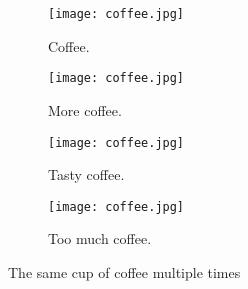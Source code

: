 \documentclass{article}
\begin{document}
	\begin{figure}[h!]
		\centering
		\begin{subfigure}[b]{0.2\linewidth}
		
			\texttt{[image: coffee.jpg]}
			\caption{Coffee.}
		\end{subfigure}
		\begin{subfigure}[b]{0.2\linewidth}
			
			\texttt{[image: coffee.jpg]}
			\caption{More coffee.}
		\end{subfigure}
		\begin{subfigure}[b]{0.2\linewidth}
	
			\texttt{[image: coffee.jpg]}
			\caption{Tasty coffee.}
		\end{subfigure}
		\begin{subfigure}[b]{0.5\linewidth}
			\texttt{[image: coffee.jpg]}
			\caption{Too much coffee.}
		\end{subfigure}
		\caption{The same cup of coffee multiple times}
		\label{fig:coffee3}
	\end{figure}
\end{document}
